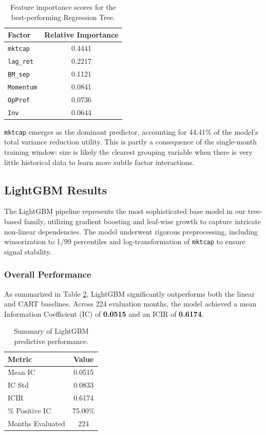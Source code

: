 \documentclass[11pt]{article}
\begin{document}
\begin{table}[H]
\centering
\begin{tabular}{lc}
\toprule
\textbf{Factor} & \textbf{Relative Importance} \\
\midrule
\texttt{mktcap}   & 0.4441 \\
\texttt{lag\_ret} & 0.2217 \\
\texttt{BM\_sep}  & 0.1121 \\
\texttt{Momentum} & 0.0841 \\
\texttt{OpProf}   & 0.0736 \\
\texttt{Inv}      & 0.0644 \\
\bottomrule
\end{tabular}
\caption{Feature importance scores for the best-performing Regression Tree.}
\label{tab:cart_importance}
\end{table}

\texttt{mktcap} emerges as the dominant predictor, accounting for 44.41\% of the model's total variance reduction utility. This is partly a consequence of the single-month training window: size is likely the clearest grouping variable when there is very little historical data to learn more subtle factor interactions.

\subsection{LightGBM Results}
The LightGBM pipeline represents the most sophisticated base model in our tree-based family, utilizing gradient boosting and leaf-wise growth to capture intricate non-linear dependencies. The model underwent rigorous preprocessing, including winsorization to 1/99 percentiles and log-transformation of \texttt{mktcap} to ensure signal stability.

\subsubsection{Overall Performance}
As summarized in Table \ref{tab:lgbm_results}, LightGBM significantly outperforms both the linear and CART baselines. Across 224 evaluation months, the model achieved a mean Information Coefficient (IC) of \textbf{0.0515} and an ICIR of \textbf{0.6174}.

\begin{table}[H]
\centering
\begin{tabular}{lc}
\toprule
\textbf{Metric} & \textbf{Value} \\
\midrule
Mean IC & 0.0515 \\
IC Std & 0.0833 \\
ICIR & 0.6174 \\
\% Positive IC & 75.00\% \\
Months Evaluated & 224 \\
\bottomrule
\end{tabular}
\caption{Summary of LightGBM predictive performance.}
\label{tab:lgbm_results}
\end{table}
\end{document}
